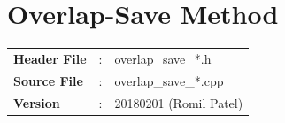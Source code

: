 %
%
\clearpage
\section{Overlap-Save Method}
\begin{refsection}
\begin{tcolorbox}	
	\begin{tabular}{p{2.75cm} p{0.2cm} p{10.5cm}} 	
		\textbf{Header File}   &:&overlap\_save\_*.h \\
		\textbf{Source File}   &:&overlap\_save\_*.cpp \\
		\textbf{Version}       &:& 20180201 (Romil Patel)
	\end{tabular}
\end{tcolorbox}


\end{refsection}
